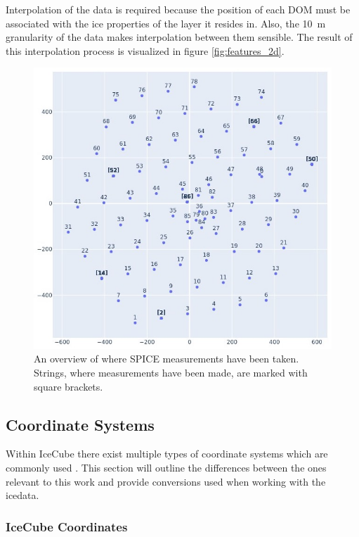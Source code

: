 \documentclass[a4paper,10pt]{scrartcl}
\begin{document}
Interpolation of the data is required because the position of each DOM must be associated with the ice properties of the layer it resides in.
Also, the \SI{10}{m} granularity of the data makes interpolation between them sensible.
The result of this interpolation process is visualized in figure \ref{fig:features_2d}.

\begin{figure}[h]
    \includegraphics[scale=0.5]{images/string_overview.jpg}
    \centering
    \caption{An overview of where SPICE measurements have been taken. Strings, where measurements have been made, are marked with square brackets.}
    \label{fig:string_overview}
\end{figure}

\subsection{Coordinate Systems}
\label{coordinates}

Within IceCube there exist multiple types of coordinate systems which are commonly used \cite{coordinates-icecube}.
This section will outline the differences between the ones relevant to this work and provide conversions used when working with the icedata.

\subsubsection*{IceCube Coordinates}
\end{document}
